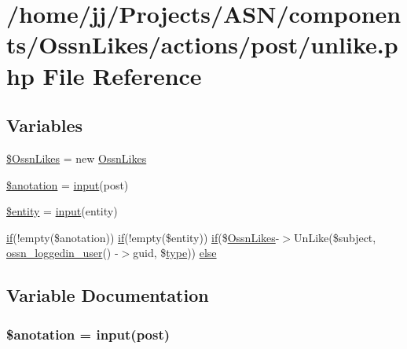 \hypertarget{post_2unlike_8php}{}\section{/home/jj/\+Projects/\+A\+S\+N/components/\+Ossn\+Likes/actions/post/unlike.php File Reference}
\label{post_2unlike_8php}
\subsection*{Variables}
\begin{DoxyCompactItemize}
\item 
\hyperlink{post_2unlike_8php_a227f36ff099a95468945a2fabc5c0782}{\$\+Ossn\+Likes} = new \hyperlink{class_ossn_likes}{Ossn\+Likes}
\item 
\hyperlink{post_2unlike_8php_af900958147bf7360167d1927035a1e9a}{\$anotation} = \hyperlink{ossn_8lib_8input_8php_a64ebee98b041c4f75f71ed3cd73cc8ed}{input}(\textquotesingle{}post\textquotesingle{})
\item 
\hyperlink{post_2unlike_8php_a74ed34e6d7bc9f3f8c4fb58a12247ee2}{\$entity} = \hyperlink{ossn_8lib_8input_8php_a64ebee98b041c4f75f71ed3cd73cc8ed}{input}(\textquotesingle{}entity\textquotesingle{})
\item 
\hyperlink{jquery_8tokeninput_8js_ad8dd46a3cbc004569e34401e9e71771a}{if}(!empty(\$anotation)) \hyperlink{jquery_8tokeninput_8js_ad8dd46a3cbc004569e34401e9e71771a}{if}(!empty(\$entity)) \hyperlink{jquery_8tokeninput_8js_ad8dd46a3cbc004569e34401e9e71771a}{if}(\$\hyperlink{class_ossn_likes}{Ossn\+Likes}-\/$>$Un\+Like(\$subject, \hyperlink{ossn_8lib_8users_8php_aa3c8068d0e6638b414d6a2f6c62565b8}{ossn\+\_\+loggedin\+\_\+user}() -\/$>$guid, \$\hyperlink{_ossn_wall_2actions_2wall_2post_2group_8php_a2dc1bb4e1ed0029daa81ac0776b14b51}{type})) \hyperlink{post_2unlike_8php_a3d440c410af257318642b9a619682a7f}{else}
\end{DoxyCompactItemize}


\subsection{Variable Documentation}
\subsubsection[{\texorpdfstring{\$anotation}{$anotation}}]{\setlength{\rightskip}{0pt plus 5cm}\$anotation = {\bf input}(\textquotesingle{}post\textquotesingle{})}\hypertarget{post_2unlike_8php_af900958147bf7360167d1927035a1e9a}{}\label{post_2unlike_8php_af900958147bf7360167d1927035a1e9a}


